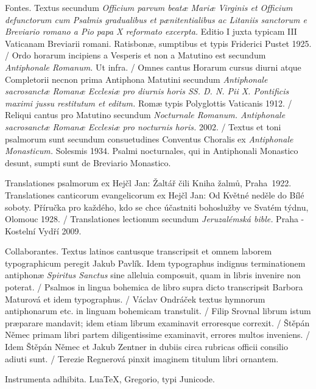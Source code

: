 \documentclass[a4paper, twoside, 12pt]{article}
\begin{document}
Fontes. 
Textus secundum 
\textit{Officium parvum beatæ Mariæ Virginis et Officium
defunctorum cum Psalmis gradualibus et pænitentialibus ac Litaniis sanctorum
e Breviario romano a Pio papa X reformato excerpta.}
Editio I juxta typicam III Vaticanam Breviarii romani. 
Ratisbonæ, sumptibus et typis Friderici Pustet 1925. /
Ordo horarum incipiens a Vesperis et non a Matutino est secundum
\textit{Antiphonale Romanum.} Ut infra. /
Omnes cantus Horarum cursus diurni atque Completorii 
necnon prima Antiphona Matutini secundum
\textit{Antiphonale sacrosanctæ Romanæ Ecclesiæ pro diurnis horis
SS. D. N. Pii X. Pontificis maximi jussu restitutum et editum.}
Romæ typis Polyglottis Vaticanis 1912. /
Reliqui cantus pro Matutino secundum 
\textit{Nocturnale Romanum. Antiphonale sacrosanctæ Romanæ Ecclesiæ
pro nocturnis horis.}
2002. /
Textus et toni psalmorum sunt secundum consuetudines Conventus Choralis
ex \textit{Antiphonale Monasticum.} Solesmis 1934. Psalmi nocturnales,
qui in Antiphonali Monastico desunt, sumpti sunt de Breviario Monastico.

Translationes psalmorum ex
Hejčl Jan: Žaltář čili Kniha žalmů, Praha~1922.
Translationes canticorum evangelicorum ex Hejčl Jan: 
Od Květné neděle do Bílé soboty. Příručka pro každého, kdo se chce účastniti
bohoslužby ve Svatém týdnu, Olomouc 1928. /
Translationes lectionum secundum 
\textit{Jeruzalémská bible.} Praha - Kostelní Vydří 2009.

Collaborantes.
Textus latinos cantusque transcripsit et omnem laborem typographicum peregit
Jakub Pavlík. Idem typographus indignus terminationem antiphonæ
\textit{Spiritus Sanctus} sine alleluia composuit, quam in libris invenire
non poterat. /
Psalmos in lingua bohemica de libro supra dicto transcripsit
Barbora Maturová et idem typographus. /
Václav Ondráček textus hymnorum antiphonarum etc. 
in linguam bohemicam transtulit. /
Filip Srovnal librum istum præparare mandavit; idem etiam librum examinavit
erroresque correxit. /
Štěpán Němec primam libri partem diligentissime examinavit, errores multos
inveniens. /
Idem Štěpán Němec et Jakub Zentner in dubiis circa rubricas officii
consilio adiuti sunt. /
Terezie Regnerová pinxit imaginem titulum libri ornantem.

Instrumenta adhibita.
LuaTeX, %
Gregorio, %
typi Junicode. %
\end{document}
